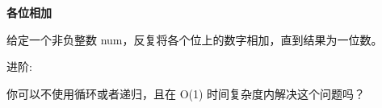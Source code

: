 \textbf{各位相加}\par

给定一个非负整数 num，反复将各个位上的数字相加，直到结果为一位数。\par

进阶:\par
你可以不使用循环或者递归，且在 O(1) 时间复杂度内解决这个问题吗？\par
